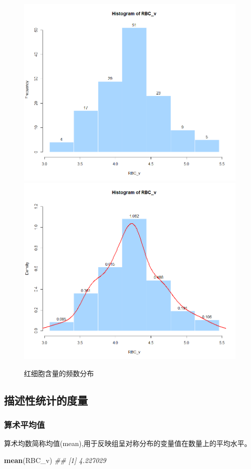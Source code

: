 \documentclass[
]{article}
\newenvironment{Shaded}{\begin{snugshade}}{\end{snugshade}}
\newcommand{\CommentTok}[1]{\textcolor[rgb]{0.56,0.35,0.01}{\textit{#1}}}
\newcommand{\KeywordTok}[1]{\textcolor[rgb]{0.13,0.29,0.53}{\textbf{#1}}}
\newcommand{\NormalTok}[1]{#1}
\begin{document}
\begin{figure}

{\centering \includegraphics[width=0.49\linewidth,height=0.49\textheight]{image/a1e3904af844b14d3b57d1448690aea} \includegraphics[width=0.49\linewidth,height=0.49\textheight]{image/5ba23e818daa7c71b147707f9b5dfd6} 

}

\caption{红细胞含量的频数分布}\label{fig:histgrah}
\end{figure}

\hypertarget{ux63cfux8ff0ux6027ux7edfux8ba1ux7684ux5ea6ux91cf}{%
\subsection{描述性统计的度量}\label{ux63cfux8ff0ux6027ux7edfux8ba1ux7684ux5ea6ux91cf}}

\hypertarget{ux7b97ux672fux5e73ux5747ux503c}{%
\subsubsection{算术平均值}\label{ux7b97ux672fux5e73ux5747ux503c}}

算术均数简称均值(mean),用于反映组呈对称分布的变量值在数量上的平均水平。

\begin{Shaded}
\begin{Highlighting}[]
\KeywordTok{mean}\NormalTok{(RBC_v)}
\CommentTok{## [1] 4.227029}
\end{Highlighting}
\end{Shaded}
\end{document}
